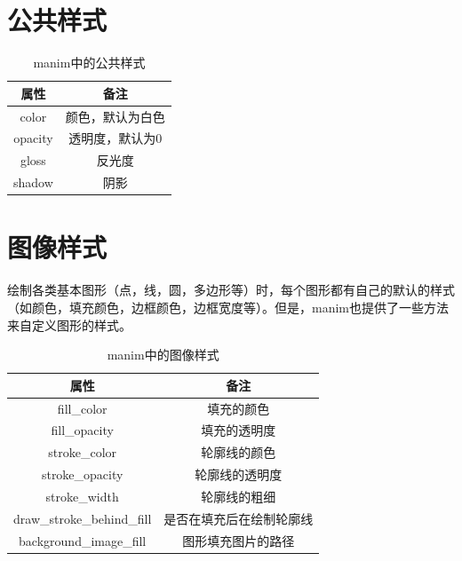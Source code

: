 \section{公共样式}
\label{sec:Manim基本图形-公共样式}
\begin{table}[htpb]
\begin{tabular}{c|c}
属性      & 备注       \\ \hline
color   & 颜色，默认为白色 \\
opacity & 透明度，默认为0 \\
gloss   & 反光度      \\
shadow  & 阴影      
\end{tabular}
\caption{manim中的公共样式}
\label{tab:manim中的公共样式}
\end{table}

\section{图像样式}
\label{sec:Manim基本图形-图像样式}
绘制各类基本图形（点，线，圆，多边形等）时，每个图形都有自己的默认的样式
（如颜色，填充颜色，边框颜色，边框宽度等）。但是，manim也提供了一些方法来自定义图形的样式。

\begin{table}[htpb]
\begin{tabular}{c|c}
属性                         & 备注           \\ \hline
fill\_color                & 填充的颜色        \\
fill\_opacity              & 填充的透明度       \\
stroke\_color              & 轮廓线的颜色       \\
stroke\_opacity            & 轮廓线的透明度      \\
stroke\_width              & 轮廓线的粗细       \\
draw\_stroke\_behind\_fill & 是否在填充后在绘制轮廓线 \\
background\_image\_fill    & 图形填充图片的路径   
\end{tabular}
\caption{manim中的图像样式}
\label{tab:manim中的图像样式}
\end{table}

